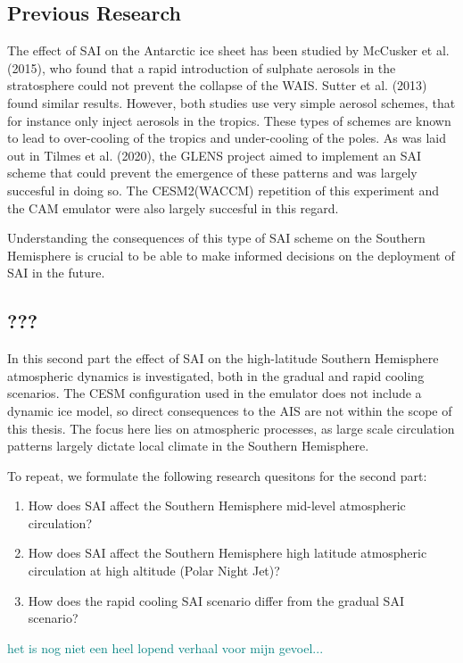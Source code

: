 \subsection{Previous Research}
The effect of SAI on the Antarctic ice sheet has been studied by McCusker et al. (2015), who found that a rapid introduction of sulphate aerosols in the stratosphere could not prevent the collapse of the WAIS. Sutter et al. (2013) found similar results. However, both studies use very simple aerosol schemes, that for instance only inject aerosols in the tropics. These types of schemes are known to lead to over-cooling of the tropics and under-cooling of the poles. As was laid out in Tilmes et al. (2020), the GLENS project aimed to implement an SAI scheme that could prevent the emergence of these patterns and was largely succesful in doing so. The CESM2(WACCM) repetition of this experiment and the
CAM emulator were also largely succesful in this regard.

Understanding the consequences of this type of SAI scheme on the Southern Hemisphere is crucial to be able to make informed decisions on the deployment of SAI in the future. 

\subsection{???}
In this second part the effect of SAI on the high-latitude Southern Hemisphere atmospheric dynamics is investigated, both in the gradual and rapid cooling scenarios. The CESM configuration used in the emulator does not include a dynamic ice model, so direct consequences to the AIS are not within the scope of this thesis. The focus here lies on atmospheric processes, as large scale circulation patterns largely dictate local climate in the Southern Hemisphere.

To repeat, we formulate the following research quesitons for the second part:

\begin{enumerate}
    \item How does SAI affect the Southern Hemisphere mid-level atmospheric circulation?
    \item How does SAI affect the Southern Hemisphere high latitude atmospheric circulation at high altitude (Polar Night Jet)?
    \item How does the rapid cooling SAI scenario differ from the gradual SAI scenario?
\end{enumerate}

\textcolor{teal}{het is nog niet een heel lopend verhaal voor mijn gevoel...}